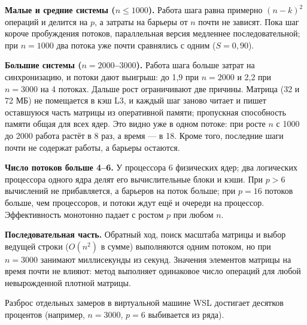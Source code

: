 {\bfseries Малые и средние системы ($n \le 1000$).} Работа шага равна
примерно $(n-k)^2$ операций и делится на $p$, а затраты на барьеры от $n$
почти не зависят. Пока шаг короче пробуждения потоков, параллельная версия
медленнее последовательной; при $n = 1000$ два потока уже почти сравнялись
с одним ($S = 0{,}90$).

{\bfseries Большие системы ($n = 2000$--$3000$).} Работа шага больше затрат
на синхронизацию, и потоки дают выигрыш: до 1,9 при $n = 2000$ и 2,2 при
$n = 3000$ на 4 потоках. Дальше рост ограничивают две причины. Матрица
(32 и 72 МБ) не помещается в кэш L3, и каждый шаг заново читает и пишет
оставшуюся часть матрицы из оперативной памяти; пропускная способность памяти
общая для всех ядер. Это видно уже в одном потоке: при росте $n$ с 1000 до 2000
работа растёт в 8 раз, а время --- в 18. Кроме того, последние шаги почти не
содержат работы, а барьеры остаются.

{\bfseries Число потоков больше 4--6.} У процессора 6 физических ядер; два
логических процессора одного ядра делят его вычислительные блоки и кэши.
При $p > 6$ вычислений не прибавляется, а барьеров на поток больше; при
$p = 16$ потоков больше, чем процессоров, и потоки ждут ещё и очереди на
процессор. Эффективность монотонно падает с ростом $p$ при любом $n$.

{\bfseries Последовательная часть.} Обратный ход, поиск масштаба матрицы и
выбор ведущей строки ($O(n^2)$ в сумме) выполняются одним потоком, но при
$n = 3000$ занимают миллисекунды из секунд. Значения элементов матрицы на время
почти не влияют: метод выполняет одинаковое число операций для любой
невырожденной плотной матрицы.

Разброс отдельных замеров в виртуальной машине WSL достигает десятков процентов
(например, $n = 3000$, $p = 6$ выбивается из ряда).
